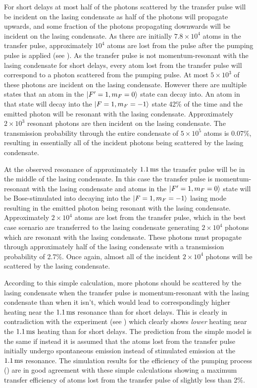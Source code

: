 For short delays at most half of the photons scattered by the transfer pulse will be incident on the lasing condensate as half of the photons will propagate upwards, and some fraction of the photons propagating downwards will be incident on the lasing condensate.  As there are initially $7.8 \times 10^4$ atoms in the transfer pulse, approximately $10^4$ atoms are lost from the pulse after the pumping pulse is applied (see ).  As the transfer pulse is not momentum-resonant with the lasing condensate for short delays, every atom lost from the transfer pulse will correspond to a photon scattered from the pumping pulse.  At most $5 \times 10^3$ of these photons are incident on the lasing condensate.  However there are multiple states that an atom in the ${\left|F'=1, m_F=0\right>}$ state can decay into.  An atom in that state will decay into the ${\left|F=1, m_F=-1\right>}$ state 42\% of the time and the emitted photon will be resonant with the lasing condensate.  Approximately $2 \times 10^3$ resonant photons are then incident on the lasing condensate.  The transmission probability through the entire condensate of $5 \times 10^5$ atoms is 0.07\%, resulting in essentially all of the incident photons being scattered by the lasing condensate.

At the observed resonance of approximately $\unit[1.1]{ms}$ the transfer pulse will be in the middle of the lasing condensate.  In this case the transfer pulse is momentum-resonant with the lasing condensate and atoms in the ${\left|F'=1, m_F=0\right>}$ state will be Bose-stimulated into decaying into the ${\left|F=1, m_F=-1\right>}$ lasing mode resulting in the emitted photon being resonant with the lasing condensate.  Approximately $2 \times 10^4$ atoms are lost from the transfer pulse, which in the best case scenario are transferred to the lasing condensate generating $2 \times 10^4$ photons which are resonant with the lasing condensate.  These photons must propagate through approximately half of the lasing condensate with a transmission probability of 2.7\%.  Once again, almost all of the incident $2 \times 10^4$ photons will be scattered by the lasing condensate.

According to this simple calculation, more photons should be scattered by the lasing condensate when the transfer pulse is momentum-resonant with the lasing condensate than when it isn't, which would lead to correspondingly higher heating near the $\unit[1.1]{ms}$ resonance than for short delays.  This is clearly in contradiction with the experiment (see ) which clearly shows \emph{lower} heating near the $\unit[1.1]{ms}$ heating than for short delays.  The prediction from the simple model is the same if instead it is assumed that the atoms lost from the transfer pulse initially undergo spontaneous emission instead of stimulated emission at the $\unit[1.1]{ms}$ resonance.  The simulation results for the efficiency of the pumping process () are in good agreement with these simple calculations showing a maximum transfer efficiency of atoms lost from the transfer pulse of slightly less than 2\%.


